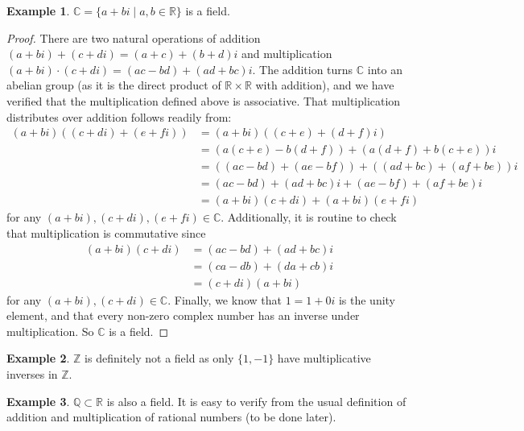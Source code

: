 \documentclass[12pt,letterpaper,DIV=11,final]{scrartcl}
\theoremstyle{plain}
\theoremstyle{definition}
\newtheorem{example}{Example}[section]
\theoremstyle{remark}
\begin{document}
\begin{example}
  $\mathbb{C} = \{ a + bi \mid a, b \in \mathbb{R} \}$ is a field.
  \begin{proof}
    There are two natural operations of addition $(a + bi) + (c + di) = (a + c) + (b + d)i$ and multiplication $(a + bi) \cdot (c + di) = (ac - bd) + (ad + bc)i$.
    The addition turns $\mathbb{C}$ into an abelian group (as it is the direct product of $\mathbb{R} \times \mathbb{R}$ with addition), and we have verified that the multiplication defined above is associative.
    That multiplication distributes over addition follows readily from:
    \begin{align*}
      (a + bi) ((c + di) + (e + fi)) &= (a + bi) ((c + e) + (d + f)i) \\
                                     &= (a (c + e) - b(d + f)) + (a (d + f) + b (c + e)) i \\
                                     &= ((ac - bd) + (ae - bf)) + ((ad + bc) + (af + be)) i \\
                                     &= (ac - bd) + (ad + bc)i + (ae - bf) + (af + be)i \\
                                     &= (a + bi) (c + di) + (a + bi) (e + fi)
    \end{align*}
    for any $(a + bi), (c + di), (e + fi) \in \mathbb{C}$.
    Additionally, it is routine to check that multiplication is commutative since
    \begin{align*}
      (a + bi)(c + di) &= (ac - bd) + (ad + bc)i \\
                       &= (ca - db) + (da + cb)i \\
                       &= (c + di) (a + bi)
    \end{align*}
    for any $(a + bi), (c + di) \in \mathbb{C}$.
    Finally, we know that $1 = 1 + 0i$ is the unity element, and that every non-zero complex number has an inverse under multiplication.
    So $\mathbb{C}$ is a field.
  \end{proof}
\end{example}

\begin{example}
  $\mathbb{Z}$ is definitely not a field as only $\{ 1, -1 \}$ have multiplicative inverses in $\mathbb{Z}$.
\end{example}

\begin{example}
  $\mathbb{Q} \subset \mathbb{R}$ is also a field.
  It is easy to verify from the usual definition of addition and multiplication of rational numbers (to be done later).
\end{example}
\end{document}
